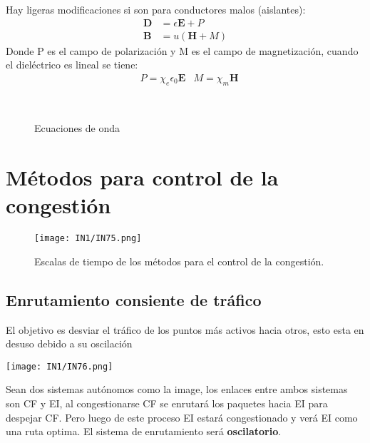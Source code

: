 \documentclass[12pt,fleqn,a4paper,]{LegrandOrangeBook}
\begin{document}
Hay ligeras modificaciones si son para conductores malos (aislantes):
\begin{subequations}
\begin{align}
\textbf{D}&= \epsilon \textbf{E} + P\\
\textbf{B}&=u(\textbf{H} + M)
\end{align}
\end{subequations}
Donde P es el campo de polarización y M es el campo de magnetización, cuando el dieléctrico es lineal se tiene:
\begin{align*}
&P=\chi_e\epsilon_0\textbf{E} &M=\chi_m\textbf{H}
\end{align*}
\begin{figure}[H]
\centering
{}\\
\caption{Ecuaciones de onda}
\end{figure}
\section{Métodos para control de la congestión}
\begin{figure}[H]
\centering
\texttt{[image: IN1/IN75.png]}
\caption{Escalas de tiempo de los métodos para el control de la congestión.}
\end{figure}
\subsection{Enrutamiento consiente de tráfico}
El objetivo es desviar el tráfico de los puntos más activos hacia otros, esto esta en desuso debido a su oscilación
\begin{center}
\texttt{[image: IN1/IN76.png]}
\end{center}
Sean dos sistemas autónomos como la image, los enlaces entre ambos sistemas son CF y EI, al congestionarse CF se enrutará los paquetes hacia EI para despejar CF. Pero luego de este proceso EI estará congestionado y verá EI como una ruta optima. El sistema de enrutamiento será \textbf{oscilatorio}.
\end{document}
